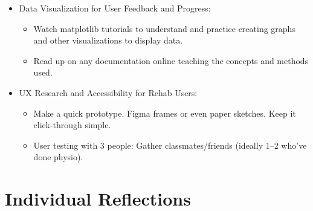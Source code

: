 \documentclass[12pt]{article}
\begin{document}
\begin{enumerate}
\begin{itemize}
    \item Data Visualization for User Feedback and Progress:
    \begin{itemize}
      \item Watch matplotlib tutorials to understand and practice creating graphs and other visualizations to display data.
      \item Read up on any documentation online teaching the concepts and methods used.
    \end{itemize}
    \item UX Research and Accessibility for Rehab Users:
    \begin{itemize}
      \item Make a quick prototype. Figma frames or even paper sketches. Keep it click-through simple.
      \item User testing with 3 people: Gather classmates/friends (ideally 1–2 who’ve done physio).
    \end{itemize}
  \end{itemize}
\end{enumerate}

\section*{Individual Reflections} 
\end{document}
